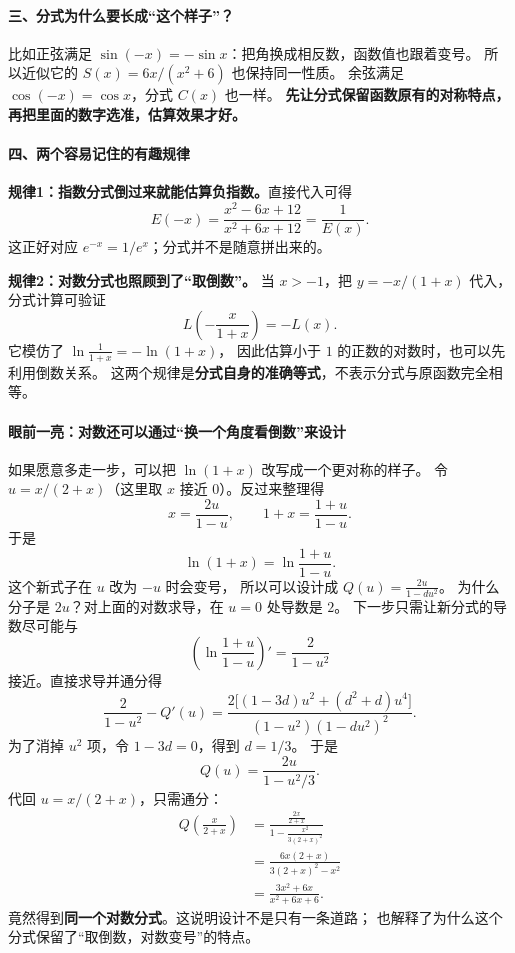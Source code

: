 \begin{explanationbox}
\paragraph{三、分式为什么要长成“这个样子”？}
比如正弦满足 $\sin(-x)=-\sin x$：把角换成相反数，函数值也跟着变号。
所以近似它的 $S(x)=6x/(x^2+6)$ 也保持同一性质。
余弦满足 $\cos(-x)=\cos x$，分式 $C(x)$ 也一样。
\textbf{先让分式保留函数原有的对称特点，再把里面的数字选准，估算效果才好。}


\paragraph{四、两个容易记住的有趣规律}
\textbf{规律1：指数分式倒过来就能估算负指数。}直接代入可得
\[
E(-x)=\frac{x^2-6x+12}{x^2+6x+12}=\frac1{E(x)}.
\]
这正好对应 $e^{-x}=1/e^x$；分式并不是随意拼出来的。

\textbf{规律2：对数分式也照顾到了“取倒数”。}
当 $x>-1$，把 $y=-x/(1+x)$ 代入，分式计算可验证
\[
L\!\left(-\frac{x}{1+x}\right)=-L(x).
\]
它模仿了 $\ln\frac1{1+x}=-\ln(1+x)$，
因此估算小于 $1$ 的正数的对数时，也可以先利用倒数关系。
这两个规律是\textbf{分式自身的准确等式}，不表示分式与原函数完全相等。


\paragraph{眼前一亮：对数还可以通过“换一个角度看倒数”来设计}
如果愿意多走一步，可以把 $\ln(1+x)$ 改写成一个更对称的样子。
令 $u=x/(2+x)$（这里取 $x$ 接近 $0$）。反过来整理得
\[
 x=\frac{2u}{1-u},\qquad 1+x=\frac{1+u}{1-u}.
\]
于是
\[
 \ln(1+x)=\ln\frac{1+u}{1-u}.
\]
这个新式子在 $u$ 改为 $-u$ 时会变号，
所以可以设计成 $Q(u)=\frac{2u}{1-du^2}$。
为什么分子是 $2u$？对上面的对数求导，在 $u=0$ 处导数是 $2$。
下一步只需让新分式的导数尽可能与
\[
 \left(\ln\frac{1+u}{1-u}\right)'=\frac{2}{1-u^2}
\]
接近。直接求导并通分得
\[
 \frac2{1-u^2}-Q'(u)
 =\frac{2\bigl[(1-3d)u^2+(d^2+d)u^4\bigr]}
 {(1-u^2)(1-du^2)^2}.
\]
为了消掉 $u^2$ 项，令 $1-3d=0$，得到 $d=1/3$。
于是
\[
 Q(u)=\frac{2u}{1-u^2/3}.
\]
代回 $u=x/(2+x)$，只需通分：
\[
 \begin{aligned}
 Q\!\left(\frac{x}{2+x}\right)
 &=\frac{\frac{2x}{2+x}}{1-\frac{x^2}{3(2+x)^2}}\\
 &=\frac{6x(2+x)}{3(2+x)^2-x^2}\\
 &=\boxed{\frac{3x^2+6x}{x^2+6x+6}}.
 \end{aligned}
\]
竟然得到\textbf{同一个对数分式}。这说明设计不是只有一条道路；
也解释了为什么这个分式保留了“取倒数，对数变号”的特点。

\end{explanationbox}
